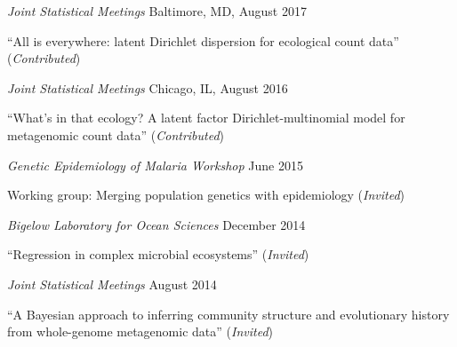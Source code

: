 \documentclass[10pt]{article}
\newenvironment{outerlist}[1][\enskip\textbullet]%
        {\begin{itemize}[#1]}{\end{itemize}%
         \vspace{-.6\baselineskip}}
\newenvironment{innerlist}[1][\enskip\textbullet]%
        {\begin{compactitem}[#1]}{\end{compactitem}}
\begin{document}
\begin{outerlist}
\item[] \textit{Joint Statistical Meetings}%
        \hfill {Baltimore, MD, August 2017}
\begin{innerlist}
\item ``All is everywhere: latent Dirichlet dispersion for ecological count data''  (\emph{Contributed})
\end{innerlist}
\end{outerlist} 

\begin{outerlist}
\item[] \textit{Joint Statistical Meetings}%
        \hfill {Chicago, IL, August 2016}
\begin{innerlist}
\item ``What's in that ecology? A latent factor Dirichlet-multinomial model for metagenomic count data''  (\emph{Contributed})
\end{innerlist}
\end{outerlist} 

\begin{outerlist}
\item[] \textit{Genetic Epidemiology of Malaria Workshop}%
        \hfill {June 2015}
\begin{innerlist}
\item  Working group: Merging population genetics with epidemiology  (\emph{Invited})
\end{innerlist}
\end{outerlist} 

\begin{outerlist}
\item[] \textit{Bigelow Laboratory for Ocean Sciences}%
        \hfill {December 2014}
\begin{innerlist}
\item ``Regression in complex microbial ecosystems''  (\emph{Invited})
\end{innerlist}
\end{outerlist}

\begin{outerlist}
\item[] \textit{Joint Statistical Meetings}%
        \hfill {August 2014}
\begin{innerlist}
\item ``A Bayesian approach to inferring community structure and evolutionary history from whole-genome metagenomic data''  (\emph{Invited})
\end{innerlist}
\end{outerlist} 
\end{document}

